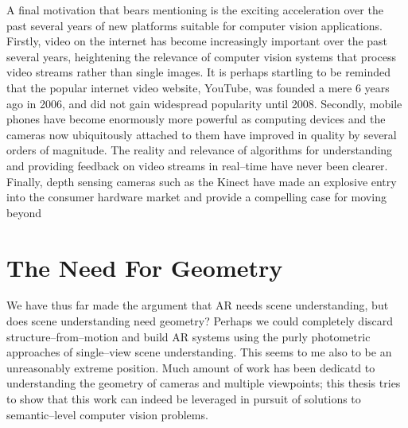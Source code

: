 

A final motivation that bears mentioning is the exciting acceleration
over the past several years of new platforms suitable for computer
vision applications. Firstly, video on the
internet has become increasingly important over the past several
years, heightening the relevance of computer vision systems that
process video streams rather than single images. It is perhaps
startling to be reminded that the popular internet video website,
YouTube, was founded a mere 6 years ago in 2006, and did not gain
widespread popularity until 2008. Secondly, mobile phones have become
enormously more powerful as computing devices and the cameras now
ubiquitously attached to them have improved in quality by several
orders of magnitude. The reality and relevance of algorithms for
understanding and providing feedback on video streams in real--time
have never been clearer. Finally, depth sensing cameras such as the
Kinect have made an explosive entry into the consumer hardware market
and provide a compelling case for moving beyond

\section{The Need For Geometry}


We have thus far made the argument that AR needs scene understanding,
but does scene understanding need geometry? Perhaps we could
completely discard structure--from--motion and build AR systems using
the purly photometric approaches of single--view scene
understanding. This seems to me also to be an unreasonably extreme
position. Much amount of work has been dedicatd to understanding
the geometry of cameras and multiple viewpoints; this thesis tries to
show that this work can indeed be leveraged in pursuit of solutions to
semantic--level computer vision problems.

